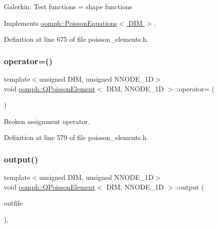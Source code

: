 Galerkin\+: Test functions = shape functions 

Implements \hyperlink{classoomph_1_1PoissonEquations_a88afb41d8733fb3488754cb579f44770}{oomph\+::\+Poisson\+Equations$<$ D\+I\+M $>$}.



Definition at line 675 of file poisson\+\_\+elements.\+h.

\mbox{\label{classoomph_1_1QPoissonElement_a944130c3b41dd3767999664686d10e93}} 
\subsubsection{\texorpdfstring{operator=()}{operator=()}}
{\footnotesize\ttfamily template$<$unsigned D\+IM, unsigned N\+N\+O\+D\+E\+\_\+1D$>$ \\
void \hyperlink{classoomph_1_1QPoissonElement}{oomph\+::\+Q\+Poisson\+Element}$<$ D\+IM, N\+N\+O\+D\+E\+\_\+1D $>$\+::operator= (\begin{DoxyParamCaption}\item[{const \hyperlink{classoomph_1_1QPoissonElement}{Q\+Poisson\+Element}$<$ D\+IM, N\+N\+O\+D\+E\+\_\+1D $>$ \&}]{ }\end{DoxyParamCaption})\hspace{0.3cm}{\ttfamily [inline]}}



Broken assignment operator. 



Definition at line 579 of file poisson\+\_\+elements.\+h.

\mbox{\label{classoomph_1_1QPoissonElement_a8ca8f7f4c9e4ba9f5558391a8e22d170}} 
\subsubsection{\texorpdfstring{output()}{output()}\hspace{0.1cm}{\footnotesize\ttfamily [1/4]}}
{\footnotesize\ttfamily template$<$unsigned D\+IM, unsigned N\+N\+O\+D\+E\+\_\+1D$>$ \\
void \hyperlink{classoomph_1_1QPoissonElement}{oomph\+::\+Q\+Poisson\+Element}$<$ D\+IM, N\+N\+O\+D\+E\+\_\+1D $>$\+::output (\begin{DoxyParamCaption}\item[{std\+::ostream \&}]{outfile }\end{DoxyParamCaption})\hspace{0.3cm}{\ttfamily [inline]}, {\ttfamily [virtual]}}



